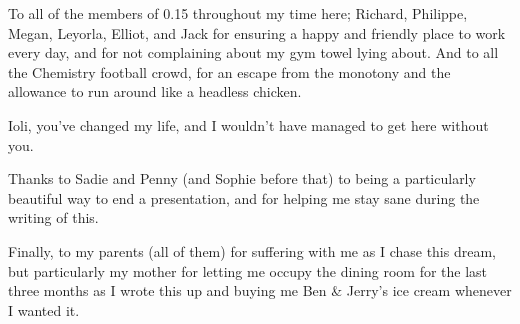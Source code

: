 \documentclass[twoside,symmetric,nobib]{./arm-thesis}
\begin{document}
\begin{fullwidth}
To all of the members of 0.15 throughout my time here; Richard, Philippe, Megan, Leyorla, Elliot, and Jack for ensuring a happy and friendly place to work every day, and for not complaining about my gym towel lying about. And to all the Chemistry football crowd, for an escape from the monotony and the allowance to run around like a headless chicken.
\vspace{\baselineskip}

Ioli, you've changed my life, and I wouldn't have managed to get here without you.

Thanks to Sadie and Penny (and Sophie before that) to being a particularly beautiful way to end a presentation, and for helping me stay sane during the writing of this.

Finally, to my parents (all of them) for suffering with me as I chase this dream, but particularly my mother for letting me occupy the dining room for the last three months as I wrote this up and buying me Ben \& Jerry's ice cream whenever I wanted it.
\end{fullwidth}

\tableofcontents



\end{document}
